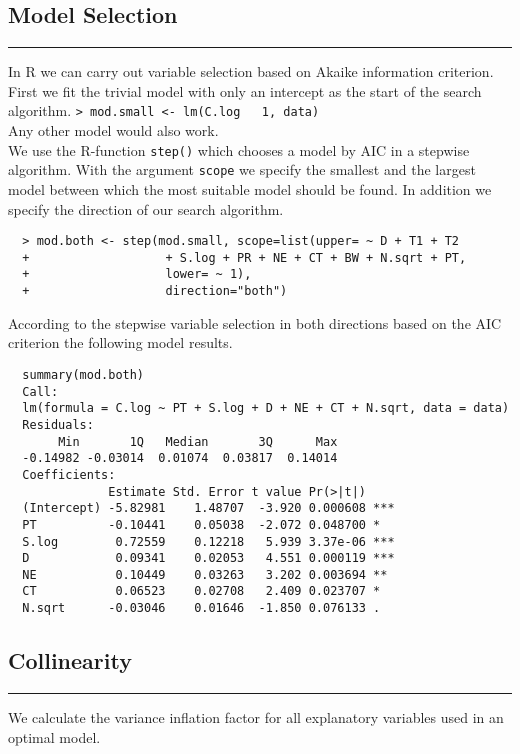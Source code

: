 \subsection{Model Selection}
\noindent\rule[\linienAbstand]{\linewidth}{\linienDicke}
In R we can carry out variable selection based on Akaike information criterion. First we fit the trivial model with only an intercept as the start of the search algorithm. \texttt{> mod.small <- lm(C.log ~ 1, data)}\\
Any other model would also work.\\
We use the R-function \texttt{step()} which chooses a model by AIC in a stepwise algorithm. With the argument \texttt{scope} we specify the smallest and the largest model between which the most suitable model should be found. In addition we specify the direction of our search algorithm.\\

\begingroup
  \scriptsize
  \begin{verbatim}
  > mod.both <- step(mod.small, scope=list(upper= ~ D + T1 + T2
  +                   + S.log + PR + NE + CT + BW + N.sqrt + PT,
  +                   lower= ~ 1),
  +                   direction="both")

  \end{verbatim}
\endgroup
According to the stepwise variable selection in both directions based on the AIC criterion the following model results.\\

\begingroup
  \scriptsize
  \begin{verbatim}
  summary(mod.both)
  Call:
  lm(formula = C.log ~ PT + S.log + D + NE + CT + N.sqrt, data = data)
  Residuals:
       Min       1Q   Median       3Q      Max
  -0.14982 -0.03014  0.01074  0.03817  0.14014
  Coefficients:
              Estimate Std. Error t value Pr(>|t|)
  (Intercept) -5.82981    1.48707  -3.920 0.000608 ***
  PT          -0.10441    0.05038  -2.072 0.048700 *
  S.log        0.72559    0.12218   5.939 3.37e-06 ***
  D            0.09341    0.02053   4.551 0.000119 ***
  NE           0.10449    0.03263   3.202 0.003694 **
  CT           0.06523    0.02708   2.409 0.023707 *
  N.sqrt      -0.03046    0.01646  -1.850 0.076133 .

\end{verbatim}
\endgroup


\subsection{Collinearity}
\noindent\rule[\linienAbstand]{\linewidth}{\linienDicke}
We calculate the variance inflation factor for all explanatory variables used in an optimal model.\\

